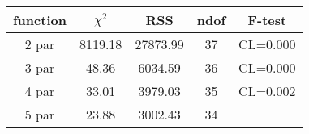 \begin{tabular}{c|c|c|c|c}
function & $\chi^2$ & RSS & ndof & F-test \\
\hline
2 par & 8119.18 & 27873.99 & 37 & CL=0.000 \\
3 par & 48.36 & 6034.59 & 36 & CL=0.000 \\
4 par & 33.01 & 3979.03 & 35 & CL=0.002 \\
5 par & 23.88 & 3002.43 & 34 & \\
\hline
\end{tabular}